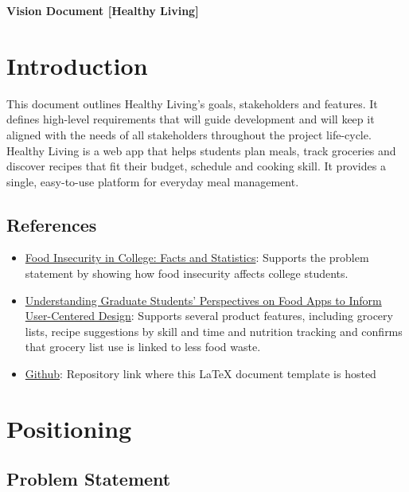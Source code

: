 \documentclass[10pt,letterpaper]{article}
\begin{document}
\begin{center}
    {\fontsize{24}{28}\selectfont\bfseries Vision Document [Healthy Living]}\\[0.5em]
\end{center}

\section{Introduction}

This document outlines Healthy Living's goals, stakeholders and features. It defines high-level requirements that will guide development and will keep it aligned with the needs of all stakeholders throughout the project life-cycle. Healthy Living is a web app that helps students plan meals, track groceries and discover recipes that fit their budget, schedule and cooking skill. It provides a single, easy-to-use platform for everyday meal management.


\subsection{References}

{\footnotesize
\begin{itemize}[leftmargin=1.5em]
  \item \href{https://www.bestcolleges.com/research/food-insecurity-statistics-college-students/}{Food Insecurity in College: Facts and Statistics}: Supports the problem statement by showing how food insecurity affects college students.
  \item \href{https://formative.jmir.org/2026/1/e84576}{Understanding Graduate Students' Perspectives on Food Apps to Inform User-Centered Design}: Supports several product features, including grocery lists, recipe suggestions by skill and time and nutrition tracking and confirms that grocery list use is linked to less food waste.
  \item \href{https://github.com/jdiaz216/SOEN-6481-Healthy-Living/blob/master/vision-template.tex}{Github}: Repository link where this LaTeX document template is hosted
  
\end{itemize}
}

\section{Positioning}

\subsection{Problem Statement}
\end{document}
